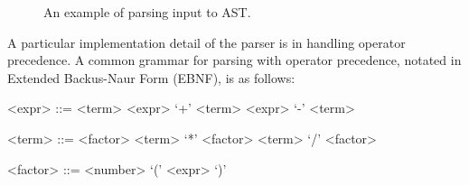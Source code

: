 \begin{figure}[h]
    \begin{center}
    \end{center}
    \caption{An example of parsing input to AST.}
\end{figure}

A particular implementation detail of the parser is in handling operator precedence. A common
grammar for parsing with operator precedence, notated in Extended Backus-Naur Form (EBNF), is as
follows:

\begin{center}
    \begin{grammar}
        <expr> ::= <term>
        \alt <expr> `+' <term>
        \alt <expr> `-' <term>

        <term> ::= <factor>
        \alt <term> `*' <factor>
        \alt <term> `/' <factor>

        <factor> ::= <number>
        \alt `(' <expr> `)'
    \end{grammar}
\end{center}

